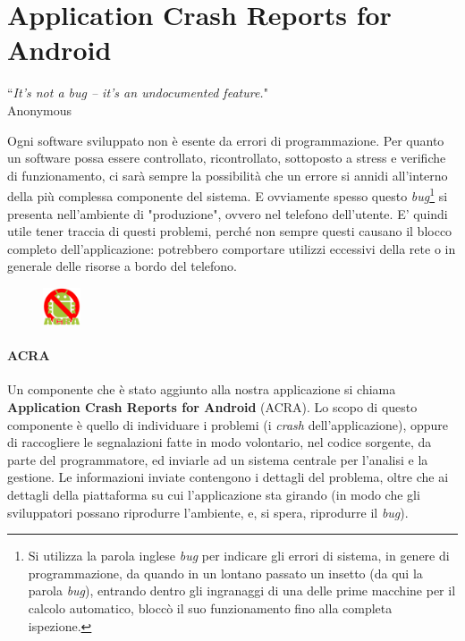 \documentclass[a4paper,10pt]{memoir}
\begin{document}
\clearpage

\section{Application Crash Reports for Android}

\begin{flushright}
``\textit{It's not a bug – it's an undocumented feature.}" \\ Anonymous
\end{flushright}

Ogni software sviluppato non è esente da errori di programmazione. Per quanto un software possa essere controllato, ricontrollato, sottoposto a stress e verifiche di funzionamento, ci sarà sempre la possibilità che un errore si annidi all'interno della più complessa componente del sistema. E ovviamente spesso questo \textit{bug}\footnote{Si utilizza la parola inglese \textit{bug} per indicare gli errori di sistema, in genere di programmazione, da quando in un lontano passato un insetto (da qui la parola \textit{bug}), entrando dentro gli ingranaggi di una delle prime macchine per il calcolo automatico, bloccò il suo funzionamento fino alla completa ispezione.} si presenta nell'ambiente di "produzione", ovvero nel telefono dell'utente. E' quindi utile tener traccia di questi problemi, perché non sempre questi causano il blocco completo dell'applicazione: potrebbero comportare utilizzi eccessivi della rete o in generale delle risorse a bordo del telefono.

\begin{figure}
\includegraphics[width=0.10\textwidth]{dev/ACRA}
\end{figure}

\paragraph{ACRA} Un componente che è stato aggiunto alla nostra applicazione si chiama \textbf{Application Crash Reports for Android} (ACRA). Lo scopo di questo componente è quello di individuare i problemi (i \textit{crash} dell'applicazione), oppure di raccogliere le segnalazioni fatte in modo volontario, nel codice sorgente, da parte del programmatore, ed inviarle ad un sistema centrale per l'analisi e la gestione. Le informazioni inviate contengono i dettagli del problema, oltre che ai dettagli della piattaforma su cui l'applicazione sta girando (in modo che gli sviluppatori possano riprodurre l'ambiente, e, si spera, riprodurre il \textit{bug}).
\end{document}
